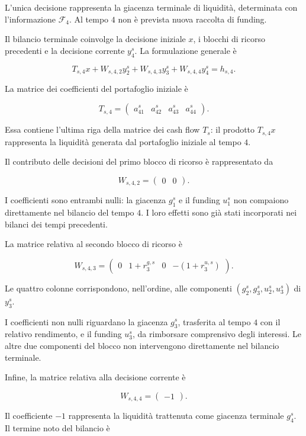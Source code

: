 L'unica decisione rappresenta la giacenza
terminale di liquidit\`a, determinata
con l'informazione $\mathcal F_4$.
Al tempo $4$ non \`e prevista
nuova raccolta di funding.

Il bilancio terminale coinvolge la decisione
iniziale $x$, i blocchi di ricorso precedenti
e la decisione corrente $y_4^s$.
La formulazione generale \`e

\[
T_{s,4}x+
W_{s,4,2}y_2^s+
W_{s,4,3}y_3^s+
W_{s,4,4}y_4^s
=
h_{s,4}.
\]

La matrice dei coefficienti del portafoglio
iniziale \`e

\[
T_{s,4}
=
\begin{pmatrix}
a_{41}^s&a_{42}^s&a_{43}^s&a_{44}^s
\end{pmatrix}.
\]

Essa contiene l'ultima riga della matrice
dei cash flow $T_s$: il prodotto $T_{s,4}x$
rappresenta la liquidit\`a generata
dal portafoglio iniziale al tempo $4$.

Il contributo delle decisioni del primo
blocco di ricorso \`e rappresentato da

\[
W_{s,4,2}
=
\begin{pmatrix}
0&0
\end{pmatrix}.
\]

I coefficienti sono entrambi nulli:
la giacenza $g_1^s$ e il funding $u_1^s$
non compaiono direttamente nel bilancio
del tempo $4$. I loro effetti sono
gi\`a stati incorporati nei bilanci
dei tempi precedenti.

La matrice relativa al secondo blocco
di ricorso \`e

\[
W_{s,4,3}
=
\begin{pmatrix}
0&
1+r_3^{g,s}&
0&
-(1+r_3^{u,s})
\end{pmatrix}.
\]

Le quattro colonne corrispondono,
nell'ordine, alle componenti
$(g_2^s,g_3^s,u_2^s,u_3^s)$ di $y_3^s$.

I coefficienti non nulli riguardano
la giacenza $g_3^s$, trasferita
al tempo $4$ con il relativo rendimento,
e il funding $u_3^s$, da rimborsare
comprensivo degli interessi.
Le altre due componenti del blocco
non intervengono direttamente
nel bilancio terminale.

Infine, la matrice relativa alla
decisione corrente \`e

\[
W_{s,4,4}
=
\begin{pmatrix}
-1
\end{pmatrix}.
\]

Il coefficiente $-1$ rappresenta
la liquidit\`a trattenuta come
giacenza terminale $g_4^s$.
Il termine noto del bilancio \`e

